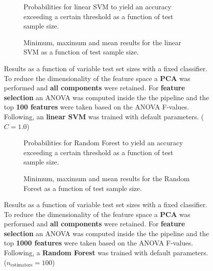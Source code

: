 \begin{figure}
    \captionsetup[subfigure]{justification=justified,singlelinecheck=false}
    \begin{subfigure}[t]{0.61\textwidth}
        
        \caption{Probabilities for linear SVM to yield an accuracy exceeding a certain threshold as a function of test sample size.}
    \end{subfigure}
    \hspace{3.0mm}
    \begin{subfigure}[t]{0.34\textwidth}
        
        \caption{Minimum, maximum and mean results for the linear SVM as a function of test sample size.}
    \end{subfigure}
    \caption[Effects of varying test sample size. Linear SVM; Preprocessing: PCA ($n_\text{components} = \text{all}$); ANOVA feature selection ($k_\text{best} = \num{100}$)]{Results as a function of variable test set sizes with a fixed classifier. To reduce the dimensionality of the feature space a \textbf{PCA} was performed and \textbf{all components} were retained. For \textbf{feature selection} an ANOVA was computed inside the the pipeline and the top \textbf{\num{100} features} were taken based on the ANOVA F-values. Following, an \textbf{{linear SVM}} was trained with default parameters. ($C=\num{1.0}$)}
    \label{fig:PCA_all_components_100_best_selected_LinearSVC}
\end{figure}

\begin{figure}
    \captionsetup[subfigure]{justification=justified,singlelinecheck=false}
    \begin{subfigure}[t]{0.61\textwidth}
        
        \caption{Probabilities for Random Forest to yield an accuracy exceeding a certain threshold as a function of test sample size.}
    \end{subfigure}
    \hspace{3.0mm}
    \begin{subfigure}[t]{0.34\textwidth}
        
        \caption{Minimum, maximum and mean results for the Random Forest as a function of test sample size.}
    \end{subfigure}
    \caption[Effects of varying test sample size. Random Forest; Preprocessing: PCA ($n_\text{components} = \text{all}$); ANOVA feature selection ($k_\text{best} = \num{1000}$)]{Results as a function of variable test set sizes with a fixed classifier. To reduce the dimensionality of the feature space a \textbf{PCA} was performed and \textbf{all components} were retained. For \textbf{feature selection} an ANOVA was computed inside the the pipeline and the top \textbf{\num{1000} features} were taken based on the ANOVA F-values. Following, a \textbf{{Random Forest}} was trained with default parameters. ($n_\text{estimators}=\num{100}$)}
    \label{fig:PCA_all_components_1000_best_selected_RandomForest}
\end{figure}

